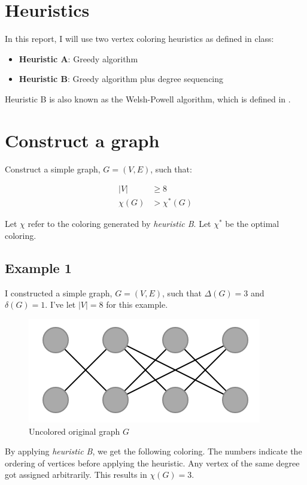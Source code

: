 \documentclass{article}
\begin{document}
\section*{Heuristics}
In this report, I will use two vertex coloring heuristics as defined in class:
\begin{itemize}
\item \textbf{Heuristic A}: Greedy algorithm
\item \textbf{Heuristic B}: Greedy algorithm plus degree sequencing
\end{itemize}

Heuristic B is also known as the Welsh-Powell algorithm, which is defined in \cite{welsh}.

\section*{Construct a graph}
Construct a simple graph, \(G = (V, E)\), such that:

\begin{align}
|V| &\geq 8 \\
\chi(G) &> \chi^{*}(G)
\end{align}

Let \(\chi\) refer to the coloring generated by \emph{heuristic B}. Let \(\chi^{*}\) be the optimal coloring.

\subsection*{Example 1}
I constructed a simple graph, \(G = (V, E)\), such that \(\Delta(G) = 3\) and \(\delta(G) = 1\). I've let \(|V| = 8\) for this example.

\begin{figure}[H]
\centering
\includegraphics[scale=0.6]{graph-1.png}
\caption{Uncolored original graph \(G\)}
\end{figure}

By applying \emph{heuristic B}, we get the following coloring. The numbers indicate the ordering of vertices before applying the heuristic. Any vertex of the same degree got assigned arbitrarily. This results in \(\chi(G) = 3\).
\end{document}
